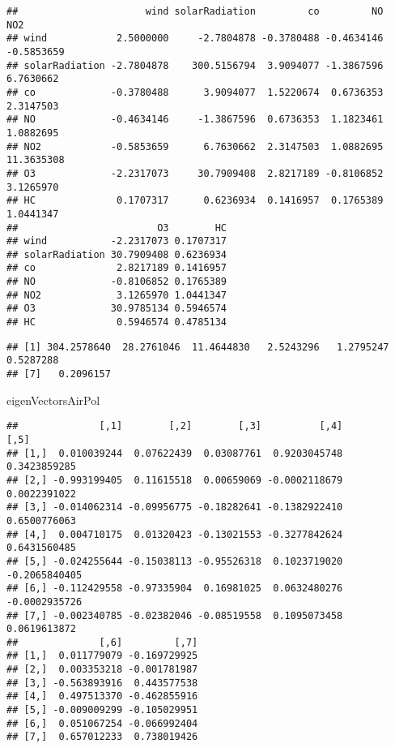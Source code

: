 \documentclass[
]{article}
\newenvironment{Shaded}{\begin{snugshade}}{\end{snugshade}}
\newcommand{\FunctionTok}[1]{\textcolor[rgb]{0.00,0.00,0.00}{#1}}
\newcommand{\NormalTok}[1]{#1}
\newcommand{\OtherTok}[1]{\textcolor[rgb]{0.56,0.35,0.01}{#1}}
\newcommand{\SpecialCharTok}[1]{\textcolor[rgb]{0.00,0.00,0.00}{#1}}
\begin{document}
\begin{verbatim}
##                      wind solarRadiation         co         NO        NO2
## wind            2.5000000     -2.7804878 -0.3780488 -0.4634146 -0.5853659
## solarRadiation -2.7804878    300.5156794  3.9094077 -1.3867596  6.7630662
## co             -0.3780488      3.9094077  1.5220674  0.6736353  2.3147503
## NO             -0.4634146     -1.3867596  0.6736353  1.1823461  1.0882695
## NO2            -0.5853659      6.7630662  2.3147503  1.0882695 11.3635308
## O3             -2.2317073     30.7909408  2.8217189 -0.8106852  3.1265970
## HC              0.1707317      0.6236934  0.1416957  0.1765389  1.0441347
##                        O3        HC
## wind           -2.2317073 0.1707317
## solarRadiation 30.7909408 0.6236934
## co              2.8217189 0.1416957
## NO             -0.8106852 0.1765389
## NO2             3.1265970 1.0441347
## O3             30.9785134 0.5946574
## HC              0.5946574 0.4785134
\end{verbatim}

\begin{Shaded}
\end{Shaded}

\begin{verbatim}
## [1] 304.2578640  28.2761046  11.4644830   2.5243296   1.2795247   0.5287288
## [7]   0.2096157
\end{verbatim}

\begin{Shaded}
\begin{Highlighting}[]
\NormalTok{eigenVectorsAirPol}
\end{Highlighting}
\end{Shaded}

\begin{verbatim}
##              [,1]        [,2]        [,3]          [,4]          [,5]
## [1,]  0.010039244  0.07622439  0.03087761  0.9203045748  0.3423859285
## [2,] -0.993199405  0.11615518  0.00659069 -0.0002118679  0.0022391022
## [3,] -0.014062314 -0.09956775 -0.18282641 -0.1382922410  0.6500776063
## [4,]  0.004710175  0.01320423 -0.13021553 -0.3277842624  0.6431560485
## [5,] -0.024255644 -0.15038113 -0.95526318  0.1023719020 -0.2065840405
## [6,] -0.112429558 -0.97335904  0.16981025  0.0632480276 -0.0002935726
## [7,] -0.002340785 -0.02382046 -0.08519558  0.1095073458  0.0619613872
##              [,6]         [,7]
## [1,]  0.011779079 -0.169729925
## [2,]  0.003353218 -0.001781987
## [3,] -0.563893916  0.443577538
## [4,]  0.497513370 -0.462855916
## [5,] -0.009009299 -0.105029951
## [6,]  0.051067254 -0.066992404
## [7,]  0.657012233  0.738019426
\end{verbatim}
\end{document}
